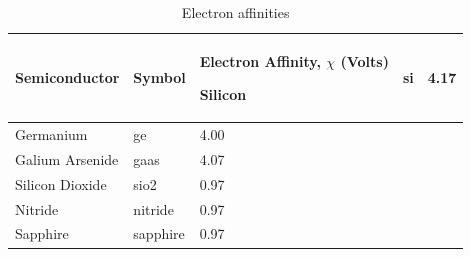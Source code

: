 



\small

\begin{longtable}[htbp]{|
>{\setlength{\hsize}{0.6\hsize}}Y|
>{\setlength{\hsize}{0.5\hsize}}Y|
>{\setlength{\hsize}{0.5\hsize}}Y|} 

  \caption[Electron affinities]{Electron affinities
    \label{elecAffinTable}}
\\
\hline

\color{white} \bf Semiconductor &
\color{white} \bf Symbol &
\color{white} \bf Electron Affinity, $\chi$ (Volts) \endhead \hline

   Silicon                &  si             &  4.17   \\ \hline
   Germanium              &  ge             &  4.00   \\ \hline
   Galium Arsenide        &  gaas           &  4.07   \\ \hline
   Silicon Dioxide        &  sio2           &  0.97   \\ \hline
   Nitride                &  nitride        &  0.97   \\ \hline
   Sapphire               &  sapphire       &  0.97   \\ \hline

\end{longtable}


